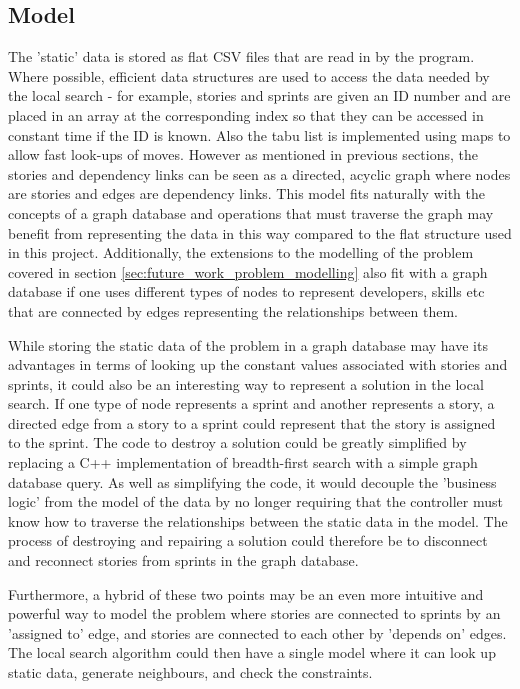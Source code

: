 \subsection{Model}
The 'static' data is stored as flat CSV files that are read in by the program. Where possible, efficient data structures are used to access the data needed by the local search - for example, stories and sprints are given an ID number and are placed in an array at the corresponding index so that they can be accessed in constant time if the ID is known. Also the tabu list is implemented using maps to allow fast look-ups of moves. However as mentioned in previous sections, the stories and dependency links can be seen as a directed, acyclic graph where nodes are stories and edges are dependency links. This model fits naturally with the concepts of a graph database and operations that must traverse the graph may benefit from representing the data in this way compared to the flat structure used in this project. Additionally, the extensions to the modelling of the problem covered in section \ref{sec:future_work_problem_modelling} also fit with a graph database if one uses different types of nodes to represent developers, skills etc that are connected by edges representing the relationships between them.

While storing the static data of the problem in a graph database may have its advantages in terms of looking up the constant values associated with stories and sprints, it could also be an interesting way to represent a solution in the local search. If one type of node represents a sprint and another represents a story, a directed edge from a story to a sprint could represent that the story is assigned to the sprint. The code to destroy a solution could be greatly simplified by replacing a C++ implementation of breadth-first search with a simple graph database query. As well as simplifying the code, it would decouple the 'business logic' from the model of the data by no longer requiring that the controller must know how to traverse the relationships between the static data in the model. The process of destroying and repairing a solution could therefore be to disconnect and reconnect stories from sprints in the graph database.

Furthermore, a hybrid of these two points may be an even more intuitive and powerful way to model the problem where stories are connected to sprints by an 'assigned to' edge, and stories are connected to each other by 'depends on' edges. The local search algorithm could then have a single model where it can look up static data, generate neighbours, and check the constraints.

